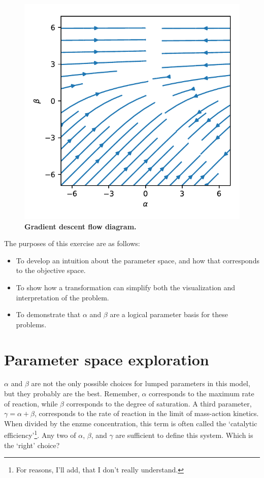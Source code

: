 \documentclass{article}
\begin{document}
\begin{figure}[!ht]
\centering
\includegraphics{figure6-gradient_descent_flow}
\caption{\textbf{Gradient descent flow diagram.}}
\label{figure:flow}
\end{figure}

The purposes of this exercise are as follows:

\begin{itemize}
	\item To develop an intuition about the parameter space, and how that corresponds to the objective space.
	\item To show how a transformation can simplify both the visualization and interpretation of the problem.
	\item To demonstrate that \(\alpha\) and \(\beta\) are a logical parameter basis for these problems.
\end{itemize}

\section{Parameter space exploration}

\(\alpha\) and \(\beta\) are not the only possible choices for lumped parameters in this model, but they probably are the best.  Remember, \(\alpha\) corresponds to the maximum rate of reaction, while \(\beta\) corresponds to the degree of saturation.  A third parameter, \(\gamma = \alpha + \beta\), corresponds to the rate of reaction in the limit of mass-action kinetics.  When divided by the enzme concentration, this term is often called the `catalytic efficiency'\footnote{For reasons, I'll add, that I don't really understand.}.  Any two of \(\alpha\), \(\beta\), and \(\gamma\) are sufficient to define this system.  Which is the `right' choice?
\end{document}
